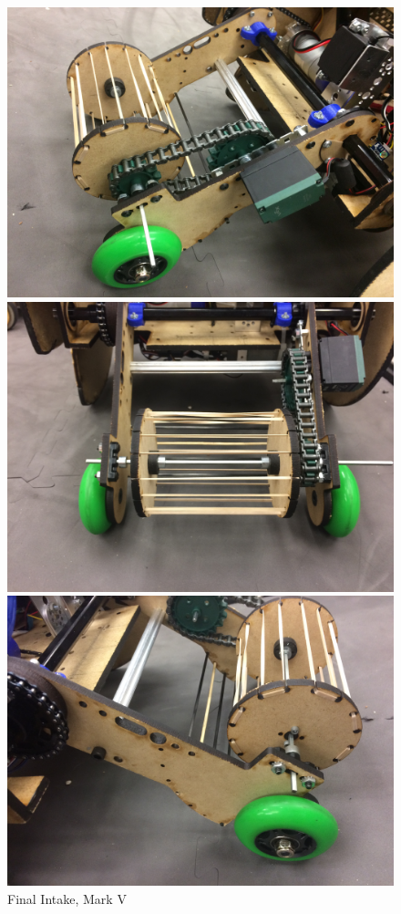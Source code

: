 \begin{figure}[htp]
\centering
\begin{minipage}{.32\textwidth}
  \centering
  \includegraphics[width= .9\linewidth]{Design_Overview/Intake_Left.JPG}
\end{minipage}%
\hfill
\begin{minipage}{.32\textwidth}
  \centering
  \includegraphics[width= .9\linewidth]{Design_Overview/Intake_Front.JPG}
	\caption{Final Intake, Mark V}
	\label{fig:triple_intake_IMG}
\end{minipage}%
	\hfill
\begin{minipage}{.32\textwidth}
  \centering
  \includegraphics[width= .9\linewidth]{Design_Overview/Intake_Right.JPG}
\end{minipage}
\end{figure}